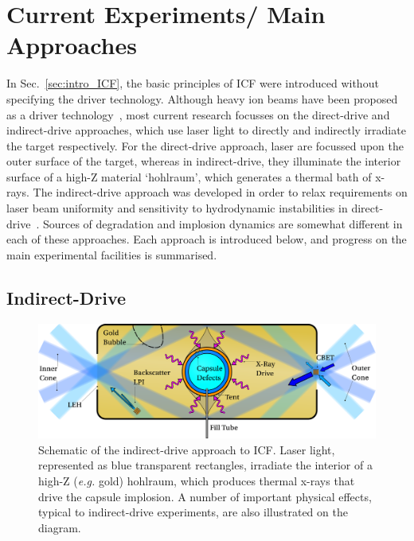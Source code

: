 \section{Current Experiments/ Main Approaches}%
\label{sec:intro_mainexperiments}

In Sec.~\ref{sec:intro_ICF}, the basic principles of \ac{ICF} were introduced without specifying the driver technology.
Although heavy ion beams have been proposed as a driver technology~\cite{metzler_target_1984}, most current research focusses on the direct-drive and indirect-drive approaches, which use laser light to directly and indirectly irradiate the target respectively.
For the direct-drive approach, laser are focussed upon the outer surface of the target, whereas in indirect-drive, they illuminate the interior surface of a high-Z material `hohlraum', which generates a thermal bath of x-rays.
The indirect-drive approach was developed in order to relax requirements on laser beam uniformity and sensitivity to hydrodynamic instabilities in direct-drive~\cite{lindl_development_1995}.
Sources of degradation and implosion dynamics are somewhat different in each of these approaches.
Each approach is introduced below, and progress on the main experimental facilities is summarised.

\subsection{Indirect-Drive}%
\label{sec:intro_indirect}

\begin{figure}[t!]
    \includegraphics[width=\linewidth]{Introduction/Images/indirect icf white.png}
    \centering
    \caption{Schematic of the indirect-drive approach to \ac{ICF}.
    Laser light, represented as blue transparent rectangles, irradiate the interior of a high-Z (\textit{e.g.} gold) hohlraum, which produces thermal x-rays that drive the capsule implosion.
    A number of important physical effects, typical to indirect-drive experiments, are also illustrated on the diagram.
    }%
    \label{fig:intro_indirect}
\end{figure}

